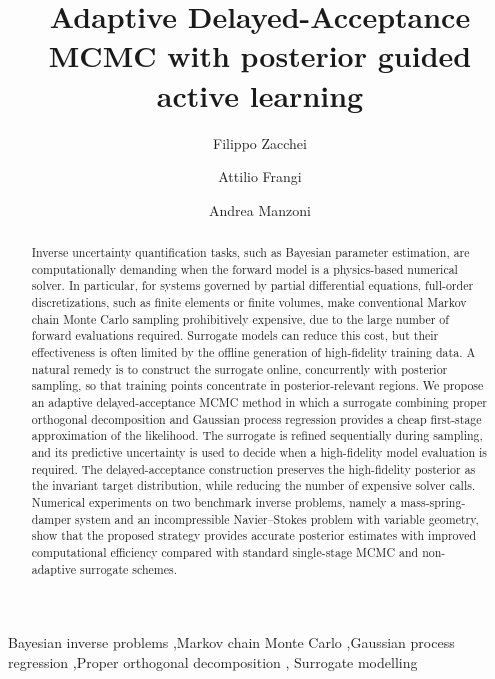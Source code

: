 \documentclass{elsarticle}
\begin{document}
\begin{frontmatter}

\title{Adaptive Delayed-Acceptance MCMC with posterior guided active learning}

\author[polimi-mox, pasteur]{Filippo Zacchei}
\author[polimi-dica]{Attilio Frangi}
\author[polimi-mox]{Andrea Manzoni}

\address[polimi-mox]{Politecnico di Milano, MOX -- Department of Mathematics,
P.za Leonardo da Vinci 32, 20133 Milano, Italy}

\address[polimi-dica]{Politecnico di Milano, Department of Civil and Environmental Engineering,
P.za Leonardo da Vinci 32, 20133 Milano, Italy}

\address[pasteur]{Pasteur Labs, Brooklyn, NY, USA}


\begin{abstract}
Inverse uncertainty quantification tasks, such as Bayesian parameter estimation,
are computationally demanding when the forward model is a physics-based
numerical solver. In particular, for systems governed by partial differential
equations, full-order discretizations, such as finite elements or finite
volumes, make conventional Markov chain Monte Carlo sampling prohibitively
expensive, due to the large number of forward evaluations required. Surrogate
models can reduce this cost, but their effectiveness is often limited by the
offline generation of high-fidelity training data. A natural remedy is to
construct the surrogate online, concurrently with posterior sampling, so that
training points concentrate in posterior-relevant regions.
We propose an adaptive delayed-acceptance MCMC method in which a surrogate
combining proper orthogonal decomposition and Gaussian process regression
provides a cheap first-stage approximation of the likelihood. The surrogate is
refined sequentially during sampling, and its predictive uncertainty is used to
decide when a high-fidelity model evaluation is required. The delayed-acceptance
construction preserves the high-fidelity posterior as the invariant target
distribution, while reducing the number of expensive solver calls.
Numerical experiments on two benchmark inverse problems, namely a
mass-spring-damper system and an incompressible Navier--Stokes problem with
variable geometry, show that the proposed strategy provides accurate posterior
estimates with improved computational efficiency compared with standard
single-stage MCMC and non-adaptive surrogate schemes.
\end{abstract}

\begin{keyword}
Bayesian inverse problems \sep Markov chain Monte Carlo
\sep Gaussian process regression \sep Proper orthogonal decomposition \sep
Surrogate modelling
\end{keyword}

\end{frontmatter}
\end{document}

